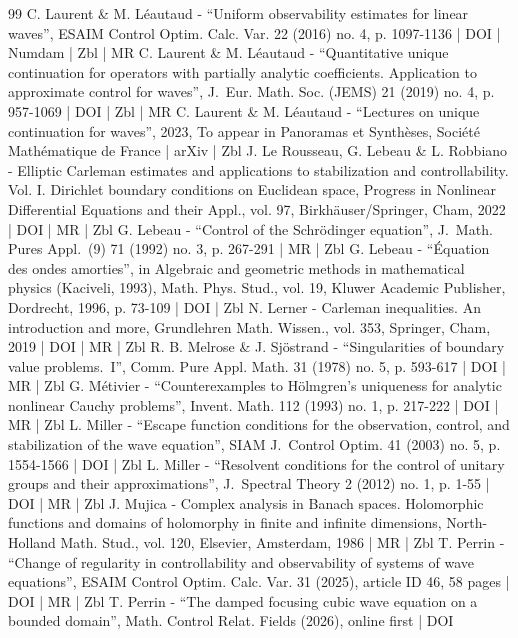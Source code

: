 \begin{thebibliography}{99}
C. Laurent \& M. Léautaud - “Uniform observability estimates for linear waves”, ESAIM Control Optim. Calc. Var. 22 (2016) no. 4, p. 1097-1136 | DOI | Numdam | Zbl | MR
C. Laurent \& M. Léautaud - “Quantitative unique continuation for operators with partially analytic coefficients. Application to approximate control for waves”, J. Eur. Math. Soc. (JEMS) 21 (2019) no. 4, p. 957-1069 | DOI | Zbl | MR
C. Laurent \& M. Léautaud - “Lectures on unique continuation for waves”, 2023, To appear in Panoramas et Synthèses, Société Mathématique de France | arXiv | Zbl
J. Le Rousseau, G. Lebeau \& L. Robbiano - Elliptic Carleman estimates and applications to stabilization and controllability. Vol. I. Dirichlet boundary conditions on Euclidean space, Progress in Nonlinear Differential Equations and their Appl., vol. 97, Birkhäuser/Springer, Cham, 2022 | DOI | MR | Zbl
G. Lebeau - “Control of the Schrödinger equation”, J. Math. Pures Appl. (9) 71 (1992) no. 3, p. 267-291 | MR | Zbl
G. Lebeau - “Équation des ondes amorties”, in Algebraic and geometric methods in mathematical physics (Kaciveli, 1993), Math. Phys. Stud., vol. 19, Kluwer Academic Publisher, Dordrecht, 1996, p. 73-109 | DOI | Zbl
N. Lerner - Carleman inequalities. An introduction and more, Grundlehren Math. Wissen., vol. 353, Springer, Cham, 2019 | DOI | MR | Zbl
R. B. Melrose \& J. Sjöstrand - “Singularities of boundary value problems. I”, Comm. Pure Appl. Math. 31 (1978) no. 5, p. 593-617 | DOI | MR | Zbl
G. Métivier - “Counterexamples to Hölmgren’s uniqueness for analytic nonlinear Cauchy problems”, Invent. Math. 112 (1993) no. 1, p. 217-222 | DOI | MR | Zbl
L. Miller - “Escape function conditions for the observation, control, and stabilization of the wave equation”, SIAM J. Control Optim. 41 (2003) no. 5, p. 1554-1566 | DOI | Zbl
L. Miller - “Resolvent conditions for the control of unitary groups and their approximations”, J. Spectral Theory 2 (2012) no. 1, p. 1-55 | DOI | MR | Zbl
J. Mujica - Complex analysis in Banach spaces. Holomorphic functions and domains of holomorphy in finite and infinite dimensions, North-Holland Math. Stud., vol. 120, Elsevier, Amsterdam, 1986 | MR | Zbl
T. Perrin - “Change of regularity in controllability and observability of systems of wave equations”, ESAIM Control Optim. Calc. Var. 31 (2025), article ID 46, 58 pages | DOI | MR | Zbl
T. Perrin - “The damped focusing cubic wave equation on a bounded domain”, Math. Control Relat. Fields (2026), online first | DOI

\end{thebibliography}
